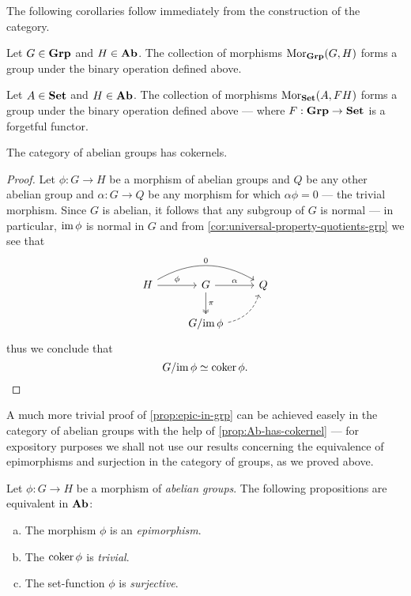 The following corollaries follow immediately from the construction of the
category.

\begin{corollary}
Let \(G \in {\textbf{Grp}}\) and \(H \in {\textbf{Ab}}\). The collection of morphisms
\(\operatorname{Mor}_{\textbf{Grp}}(G, H)\) forms a group under the binary operation defined above.
\end{corollary}

\begin{corollary}
Let \(A \in {\textbf{Set}}\) and \(H \in {\textbf{Ab}}\). The collection of morphisms
\(\operatorname{Mor}_{\textbf{Set}}(A, FH)\) forms a group under the binary operation defined above
--- where \(F: {\textbf{Grp}} \to {\textbf{Set}}\) is a forgetful functor.
\end{corollary}

\begin{proposition}[Cokernel in \(\Ab\)]
\label{prop:Ab-has-cokernel}
The category of abelian groups has cokernels.
\end{proposition}

\begin{proof}
Let \(\phi: G \to H\) be a morphism of abelian groups and \(Q\) be any other
abelian group and \(\alpha: G \to Q\) be any morphism for which
\(\alpha \phi = 0\) --- the trivial morphism. Since \(G\) is abelian, it follows
that any subgroup of \(G\) is normal --- in particular, \(\operatorname{im} \phi\) is normal
in \(G\) and from \cref{cor:universal-property-quotients-grp} we see that
\[
\begin{tikzcd}
H \ar[r, "\phi"] \ar[rr, bend left, "0"]
&G \ar[r, "\alpha"] \ar[d, two heads, "\pi"]
&Q \\
&G/{\im \phi} \ar[ru, bend right, dashed]
\end{tikzcd}
\]
thus we conclude that
\[
G/{\operatorname{im} \phi} \simeq \operatorname{coker} \phi.
\]
\end{proof}

A much more trivial proof of \cref{prop:epic-in-grp} can be achieved easely in
the category of abelian groups with the help of \cref{prop:Ab-has-cokernel} ---
for expository purposes we shall not use our results concerning the equivalence
of epimorphisms and surjection in the category of groups, as we proved above.

\begin{proposition}
\label{prop:epic-in-Ab}
Let \(\phi: G \to H\) be a morphism of \emph{abelian groups}. The following
propositions are equivalent in \(\Ab\):
\begin{enumerate}[(a)]\setlength\itemsep{0em}
\item The morphism \(\phi\) is an \emph{epimorphism}.

\item The \(\operatorname{coker} \phi\) is \emph{trivial}.

\item The set-function \(\phi\) is \emph{surjective}.
\end{enumerate}
\end{proposition}

